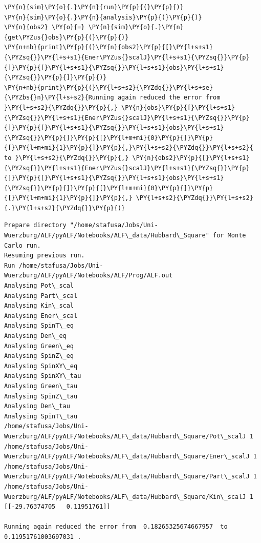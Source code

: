     \begin{tcolorbox}[breakable, size=fbox, boxrule=1pt, pad at break*=1mm,colback=cellbackground, colframe=cellborder]
\begin{Verbatim}[commandchars=\\\{\}]
\PY{n}{sim}\PY{o}{.}\PY{n}{run}\PY{p}{(}\PY{p}{)}
\PY{n}{sim}\PY{o}{.}\PY{n}{analysis}\PY{p}{(}\PY{p}{)}
\PY{n}{obs2} \PY{o}{=} \PY{n}{sim}\PY{o}{.}\PY{n}{get\PYZus{}obs}\PY{p}{(}\PY{p}{)}
\PY{n+nb}{print}\PY{p}{(}\PY{n}{obs2}\PY{p}{[}\PY{l+s+s1}{\PYZsq{}}\PY{l+s+s1}{Ener\PYZus{}scalJ}\PY{l+s+s1}{\PYZsq{}}\PY{p}{]}\PY{p}{[}\PY{l+s+s1}{\PYZsq{}}\PY{l+s+s1}{obs}\PY{l+s+s1}{\PYZsq{}}\PY{p}{]}\PY{p}{)}
\PY{n+nb}{print}\PY{p}{(}\PY{l+s+s2}{\PYZdq{}}\PY{l+s+se}{\PYZbs{}n}\PY{l+s+s2}{Running again reduced the error from }\PY{l+s+s2}{\PYZdq{}}\PY{p}{,} \PY{n}{obs}\PY{p}{[}\PY{l+s+s1}{\PYZsq{}}\PY{l+s+s1}{Ener\PYZus{}scalJ}\PY{l+s+s1}{\PYZsq{}}\PY{p}{]}\PY{p}{[}\PY{l+s+s1}{\PYZsq{}}\PY{l+s+s1}{obs}\PY{l+s+s1}{\PYZsq{}}\PY{p}{]}\PY{p}{[}\PY{l+m+mi}{0}\PY{p}{]}\PY{p}{[}\PY{l+m+mi}{1}\PY{p}{]}\PY{p}{,}\PY{l+s+s2}{\PYZdq{}}\PY{l+s+s2}{ to }\PY{l+s+s2}{\PYZdq{}}\PY{p}{,} \PY{n}{obs2}\PY{p}{[}\PY{l+s+s1}{\PYZsq{}}\PY{l+s+s1}{Ener\PYZus{}scalJ}\PY{l+s+s1}{\PYZsq{}}\PY{p}{]}\PY{p}{[}\PY{l+s+s1}{\PYZsq{}}\PY{l+s+s1}{obs}\PY{l+s+s1}{\PYZsq{}}\PY{p}{]}\PY{p}{[}\PY{l+m+mi}{0}\PY{p}{]}\PY{p}{[}\PY{l+m+mi}{1}\PY{p}{]}\PY{p}{,} \PY{l+s+s2}{\PYZdq{}}\PY{l+s+s2}{.}\PY{l+s+s2}{\PYZdq{}}\PY{p}{)}
\end{Verbatim}
\end{tcolorbox}

    \begin{Verbatim}[commandchars=\\\{\}]
Prepare directory "/home/stafusa/Jobs/Uni-
Wuerzburg/ALF/pyALF/Notebooks/ALF\_data/Hubbard\_Square" for Monte Carlo run.
Resuming previous run.
Run /home/stafusa/Jobs/Uni-Wuerzburg/ALF/pyALF/Notebooks/ALF/Prog/ALF.out
Analysing Pot\_scal
Analysing Part\_scal
Analysing Kin\_scal
Analysing Ener\_scal
Analysing SpinT\_eq
Analysing Den\_eq
Analysing Green\_eq
Analysing SpinZ\_eq
Analysing SpinXY\_eq
Analysing SpinXY\_tau
Analysing Green\_tau
Analysing SpinZ\_tau
Analysing Den\_tau
Analysing SpinT\_tau
/home/stafusa/Jobs/Uni-
Wuerzburg/ALF/pyALF/Notebooks/ALF\_data/Hubbard\_Square/Pot\_scalJ 1
/home/stafusa/Jobs/Uni-
Wuerzburg/ALF/pyALF/Notebooks/ALF\_data/Hubbard\_Square/Ener\_scalJ 1
/home/stafusa/Jobs/Uni-
Wuerzburg/ALF/pyALF/Notebooks/ALF\_data/Hubbard\_Square/Part\_scalJ 1
/home/stafusa/Jobs/Uni-
Wuerzburg/ALF/pyALF/Notebooks/ALF\_data/Hubbard\_Square/Kin\_scalJ 1
[[-29.76374705   0.11951761]]

Running again reduced the error from  0.18265325674667957  to
0.11951761003697031 .
    \end{Verbatim}

